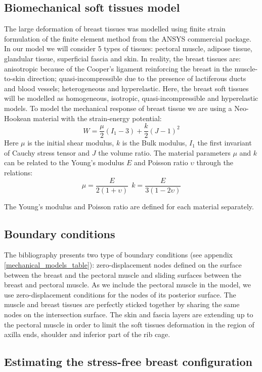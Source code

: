 \subsection{Biomechanical soft tissues model}
 The large deformation of breast tissues was modelled using finite strain formulation of the finite element method from the ANSYS commercial package. In our model we will consider 5 types of tissues: pectoral muscle, adipose tissue, glandular tissue, superficial fascia and skin. In reality, the breast tissues are: anisotropic because of the Cooper’s ligament reinforcing the breast in the muscle-to-skin direction; quasi-incompressible due to the presence of lactiferous ducts and blood vessels; heterogeneous and hyperelastic. Here, the breast soft tissues will be modelled as homogeneous, isotropic, quasi-incompressible and hyperelastic models.  To model the mechanical response of breast tissue we are using a Neo-Hookean material with the strain-energy potential:
$$W=\frac{\mu}{2}(I_1 -3) + \frac{k}{2}(J-1)^2$$
Here $\mu$ is the initial shear modulus, $k$ is the Bulk modulus, $I_1$ the first invariant of Cauchy stress tensor and $J$ the volume ratio. The material parameters $\mu$ and $k$ can be related to the Young's modulus $E$ and Poisson ratio $\upsilon$ through the relations: 
$$\mu = \frac{E}{2(1+\upsilon)}  \ \   k=\frac{E}{3(1-2\upsilon)}$$ 

The Young's modulus and Poisson ratio are defined for each material separately.
\subsection{Boundary conditions}
The bibliography presents two type of boundary conditions (see appendix \ref{mechanical_models_table}): zero-displacement nodes defined on the surface between the breast and the pectoral muscle and sliding surfaces between the breast and pectoral muscle. As we include the pectoral muscle in the model, we use zero-displacement conditions for the nodes of its posterior surface. The muscle and breast tissues are perfectly sticked together by sharing the same nodes on the intersection surface. The skin and fascia layers are extending up to the pectoral muscle in order to limit the soft tissues deformation in the region of axilla ends, shoulder and inferior part of the rib cage. 
\subsection{Estimating the stress-free breast configuration}

